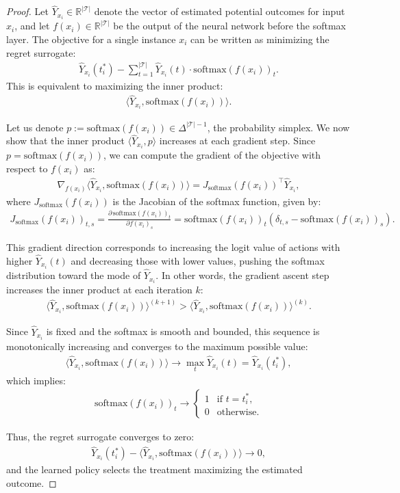 \documentclass[10pt,a4paper]{amsart}
\begin{document}
\begin{proof}
Let $\hat{Y}_{x_i} \in \mathbb{R}^{|\mathcal{T}|}$ denote the vector of estimated potential outcomes for input $x_i$, and let $f(x_i) \in \mathbb{R}^{|\mathcal{T}|}$ be the output of the neural network before the softmax layer. The objective for a single instance $x_i$ can be written as minimizing the regret surrogate:
\begin{align}
    \hat{Y}_{x_i}(t^*_i) - \sum_{t=1}^{|\mathcal{T}|} \hat{Y}_{x_i}(t) \cdot \mathrm{softmax}(f(x_i))_t.
\end{align}
This is equivalent to maximizing the inner product:
\begin{align}
    \langle \hat{Y}_{x_i}, \mathrm{softmax}(f(x_i)) \rangle.
\end{align}

Let us denote $p := \mathrm{softmax}(f(x_i)) \in \Delta^{|\mathcal{T}| - 1}$, the probability simplex. We now show that the inner product $\langle \hat{Y}_{x_i}, p \rangle$ increases at each gradient step. Since $p = \mathrm{softmax}(f(x_i))$, we can compute the gradient of the objective with respect to $f(x_i)$ as:
\begin{align}
    \nabla_{f(x_i)} \langle \hat{Y}_{x_i}, \mathrm{softmax}(f(x_i)) \rangle
    = J_{\mathrm{softmax}}(f(x_i))^\top \hat{Y}_{x_i},
\end{align}
where $J_{\mathrm{softmax}}(f(x_i))$ is the Jacobian of the softmax function, given by:
\begin{align}
    J_{\mathrm{softmax}}(f(x_i))_{t,s} = \frac{\partial \, \mathrm{softmax}(f(x_i))_t}{\partial f(x_i)_s}
    = \mathrm{softmax}(f(x_i))_t \left(\delta_{t,s} - \mathrm{softmax}(f(x_i))_s \right).
\end{align}

This gradient direction corresponds to increasing the logit value of actions with higher $\hat{Y}_{x_i}(t)$ and decreasing those with lower values, pushing the softmax distribution toward the mode of $\hat{Y}_{x_i}$. In other words, the gradient ascent step increases the inner product at each iteration $k$:
\begin{align}
    \langle \hat{Y}_{x_i}, \mathrm{softmax}(f(x_i)) \rangle^{(k+1)} 
    > \langle \hat{Y}_{x_i}, \mathrm{softmax}(f(x_i)) \rangle^{(k)}.
\end{align}

Since $\hat{Y}_{x_i}$ is fixed and the softmax is smooth and bounded, this sequence is monotonically increasing and converges to the maximum possible value:
\begin{align}
    \langle \hat{Y}_{x_i}, \mathrm{softmax}(f(x_i)) \rangle \to \max_t \hat{Y}_{x_i}(t) = \hat{Y}_{x_i}(t^*_i),
\end{align}
which implies:
\begin{align}
    \mathrm{softmax}(f(x_i))_t \to 
    \begin{cases}
        1 & \text{if } t = t^*_i, \\
        0 & \text{otherwise}.
    \end{cases}
\end{align}

Thus, the regret surrogate converges to zero:
\begin{align}
    \hat{Y}_{x_i}(t^*_i) - \langle \hat{Y}_{x_i}, \mathrm{softmax}(f(x_i)) \rangle \to 0,
\end{align}
and the learned policy selects the treatment maximizing the estimated outcome.
\end{proof}
\end{document}
